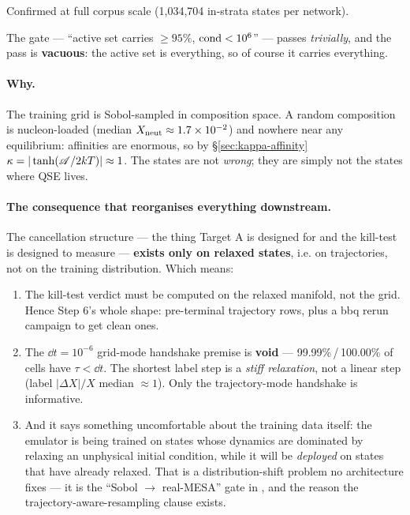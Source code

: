 Confirmed at full corpus scale (1,034,704 in-strata states per network).

The gate --- ``active set carries $\ge 95\%$, $\operatorname{cond} < 10^{6}$'' --- passes
\emph{trivially}, and the pass is \textbf{vacuous}: the active set is
everything, so of course it carries everything.

\paragraph{Why.} The training grid is Sobol-sampled in composition space. A
random composition is nucleon-loaded (median $X_{\rm neut} \approx
1.7\times10^{-2}$) and nowhere near any equilibrium: affinities are enormous, so
by \S\ref{sec:kappa-affinity} $\kappa = |\tanh(\mathscr{A}/2kT)| \approx 1$. The states
are not \emph{wrong}; they are simply not the states where QSE lives.

\paragraph{The consequence that reorganises everything downstream.} The
cancellation structure --- the thing Target A is designed for and the kill-test
is designed to measure --- \textbf{exists only on relaxed states}, i.e. on
trajectories, not on the training distribution. Which means:

\begin{enumerate}
\item The kill-test verdict must be computed on the relaxed manifold, not the
  grid. Hence Step 6's whole shape: pre-terminal trajectory rows, plus a bbq
  rerun campaign to get clean ones.
\item The $\dd t = 10^{-6}$ grid-mode handshake premise is \textbf{void} ---
  99.99\%\,/\,100.00\% of cells have $\tau < \dd t$. The shortest label step is a
  \emph{stiff relaxation}, not a linear step (label $|\Delta X|/X$ median
  $\approx 1$).  Only the trajectory-mode handshake is
  informative.
\item And it says something uncomfortable about the training data itself: the
  emulator is being trained on states whose dynamics are dominated by relaxing
  an unphysical initial condition, while it will be \emph{deployed} on states
  that have already relaxed. That is a distribution-shift problem no
  architecture fixes --- it is the ``Sobol $\to$ real-MESA'' gate in
  , and the reason the trajectory-aware-resampling clause exists.
\end{enumerate}

